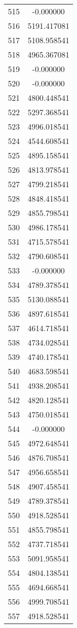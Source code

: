 \documentclass[12pt]{article}
\begin{document}
\begin{longtable}{@{}cc@{}}
515 & -0.000000 \\
516 & 5191.417081 \\
517 & 5108.958541 \\
518 & 4965.367081 \\
519 & -0.000000 \\
520 & -0.000000 \\
521 & 4800.448541 \\
522 & 5297.368541 \\
523 & 4996.018541 \\
524 & 4544.608541 \\
525 & 4895.158541 \\
526 & 4813.978541 \\
527 & 4799.218541 \\
528 & 4848.418541 \\
529 & 4855.798541 \\
530 & 4986.178541 \\
531 & 4715.578541 \\
532 & 4790.608541 \\
533 & -0.000000 \\
534 & 4789.378541 \\
535 & 5130.088541 \\
536 & 4897.618541 \\
537 & 4614.718541 \\
538 & 4734.028541 \\
539 & 4740.178541 \\
540 & 4683.598541 \\
541 & 4938.208541 \\
542 & 4820.128541 \\
543 & 4750.018541 \\
544 & -0.000000 \\
545 & 4972.648541 \\
546 & 4876.708541 \\
547 & 4956.658541 \\
548 & 4907.458541 \\
549 & 4789.378541 \\
550 & 4918.528541 \\
551 & 4855.798541 \\
552 & 4737.718541 \\
553 & 5091.958541 \\
554 & 4804.138541 \\
555 & 4694.668541 \\
556 & 4999.708541 \\
557 & 4918.528541 \\

\end{longtable}
\end{document}
